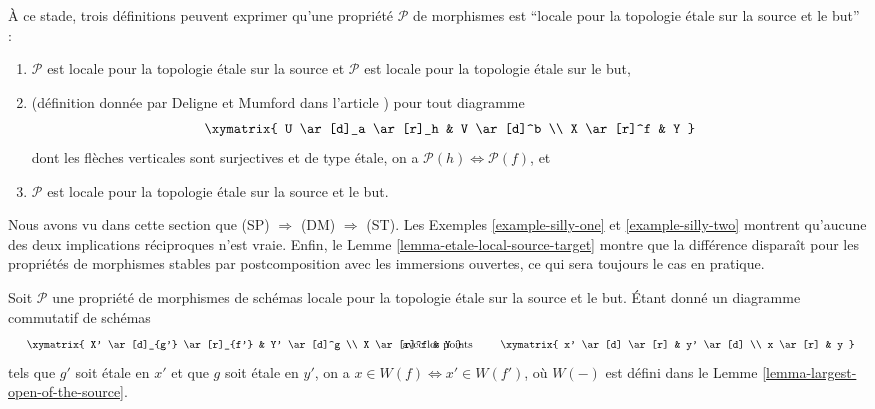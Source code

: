 \begin{remark}
\label{remark-compare-definitions}
À ce stade, trois définitions peuvent exprimer qu'une propriété
$\mathcal{P}$ de morphismes est ``locale pour la topologie \'etale sur la
source et le but'' :
\begin{enumerate}
\item[(ST)] $\mathcal{P}$ est locale pour la topologie \'etale sur la source et
$\mathcal{P}$ est locale pour la topologie \'etale sur le but,
\item[(DM)] (définition donnée par Deligne et Mumford dans l'article
\cite[Page 100]{DM}) pour tout diagramme
$$
\xymatrix{
U \ar[d]_a \ar[r]_h & V \ar[d]^b \\
X \ar[r]^f & Y
}
$$
dont les flèches verticales sont surjectives et de type \'etale, on a
$\mathcal{P}(h) \Leftrightarrow \mathcal{P}(f)$, et
\item[(SP)] $\mathcal{P}$ est locale pour la topologie \'etale sur la source et
le but.
\end{enumerate}
Nous avons vu dans cette section que (SP) $\Rightarrow$ (DM) $\Rightarrow$
(ST). Les Exemples \ref{example-silly-one} et \ref{example-silly-two} montrent
qu'aucune des deux implications réciproques n'est vraie. Enfin, le
Lemme \ref{lemma-etale-local-source-target} montre que la différence disparaît
pour les propriétés de morphismes stables par postcomposition avec les
immersions ouvertes, ce qui sera toujours le cas en pratique.
\end{remark}

\begin{lemma}
\label{lemma-etale-etale-local-source-target}
Soit $\mathcal{P}$ une propriété de morphismes de schémas locale pour la
topologie \'etale sur la source et le but. Étant donné un diagramme commutatif
de schémas
$$
\vcenter{
\xymatrix{
X' \ar[d]_{g'} \ar[r]_{f'} & Y' \ar[d]^g \\
X \ar[r]^f & Y
}
}
\quad\text{avec les points}\quad
\vcenter{
\xymatrix{
x' \ar[d] \ar[r] & y' \ar[d] \\
x \ar[r] & y
}
}
$$
tels que $g'$ soit \'etale en $x'$ et que $g$ soit \'etale en $y'$, on a
$x \in W(f) \Leftrightarrow x' \in W(f')$, où $W(-)$ est défini dans le
Lemme \ref{lemma-largest-open-of-the-source}.
\end{lemma}

